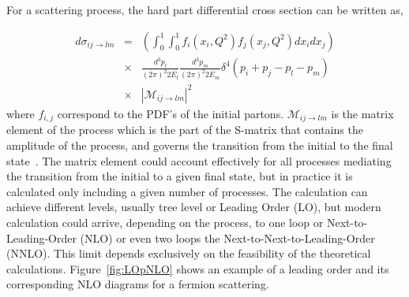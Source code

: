 For a scattering process, the hard part differential cross section can be written as,

\begin{eqnarray}
  \label{eq:DiffXS}
  d\sigma_{ij\rightarrow lm} & = & \left( \int_{0}^{1}\int_{0}^{1}f_{i}(x_{i},Q^{2})f_{j}(x_{j},Q^{2})dx_{i}dx_{j} \right) \nonumber \\  
 & \times & \frac{d^{3}p_{l}}{(2\pi)^{2}2E_{l}}\frac{d^{3}p_{m}}{(2\pi)^{2}2E_{m}}\delta^{4}\left( p_{i}+p_{j}-p_{l}-p_{m} \right) \nonumber \\  
 & \times & |\mathcal{M}_{ij\rightarrow lm}|^{2}
\end{eqnarray} where $f_{i,j}$ correspond to the PDF's of the initial partons. $\mathcal{M}_{ij\rightarrow lm}$ is the matrix element of the process which is the part of the S-matrix that contains the amplitude of the process, and governs the transition from the initial to the final state~\cite{opac-b1131978}. The matrix element could account effectively for all processes mediating the transition from the initial to a given final state, but in practice it is calculated only including a given number of processes. The calculation can achieve different levels, usually tree level or Leading Order (LO), but modern calculation could arrive, depending on the process, to one loop or Next-to-Leading-Order (NLO) or even two loops the  Next-to-Next-to-Leading-Order (NNLO). This limit depends exclusively on the feasibility of the theoretical calculations. Figure~\ref{fig:LOpNLO} shows an example of a leading order and its corresponding NLO diagrams for a fermion scattering.


